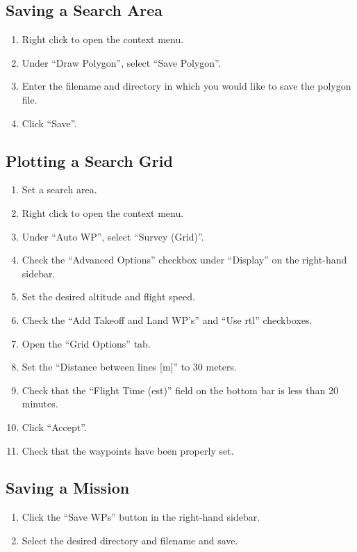 \documentclass{report}
\begin{document}
		\subsection{Saving a Search Area}
			\begin{enumerate}
				\item Right click to open the context menu.
				\item Under ``Draw Polygon'', select ``Save Polygon''.
				\item Enter the filename and directory in which you would like to save the polygon file.
				\item Click ``Save''.
			\end{enumerate}
		\subsection{Plotting a Search Grid}
			\begin{enumerate}
				\item Set a search area.
				\item Right click to open the context menu.
				\item Under ``Auto WP'', select ``Survey (Grid)''.
				\item Check the ``Advanced Options'' checkbox under ``Display'' on the right-hand sidebar.
				\item Set the desired altitude and flight speed.
				\item Check the ``Add Takeoff and Land WP's'' and ``Use \gls{rtl}'' checkboxes.
				\item Open the ``Grid Options'' tab.
				\item Set the ``Distance between lines [m]'' to 30 meters.
				\item Check that the ``Flight Time (est)'' field on the bottom bar is less than 20 minutes.
				\item Click ``Accept''.
				\item Check that the waypoints have been properly set.
			\end{enumerate}
		\subsection{Saving a Mission}
			\begin{enumerate}
				\item Click the ``Save WPs'' button in the right-hand sidebar.
				\item Select the desired directory and filename and save.
			\end{enumerate}
\end{document}
